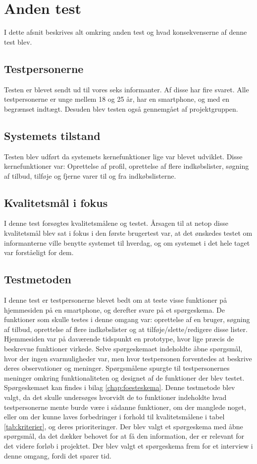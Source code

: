 \section{Anden test}
\label{sec:andentest}
I dette afsnit beskrives alt omkring anden test og hvad konsekvenserne af denne test blev. 

\subsection{Testpersonerne}
Testen er blevet sendt ud til vores seks informanter. Af disse har fire svaret. Alle testpersonerne er unge mellem 18 og 25 år, har en smartphone, og med en begrænset indtægt. Desuden blev testen også gennemgået af projektgruppen.

\subsection{Systemets tilstand}
Testen blev udført da systemets kernefunktioner lige var blevet udviklet. Disse kernefunktioner var: Oprettelse af profil, oprettelse af flere indkøbslister, søgning af tilbud, tilføje og fjerne varer til og fra indkøbslisterne. 

\subsection{Kvalitetsmål i fokus}
I denne test forsøgtes kvalitetsmålene  og  testet. Årsagen til at netop disse kvalitetsmål blev sat i fokus i den første brugertest var, at det ønskedes testet om informanterne ville benytte systemet til hverdag, og om systemet i det hele taget var forståeligt for dem. 

\subsection{Testmetoden}
I denne test er testpersonerne blevet bedt om at teste visse funktioner på hjemmesiden på en smartphone, og derefter svare på et spørgeskema. De funktioner som skulle testes i denne omgang var: oprettelse af en bruger, søgning af tilbud, oprettelse af flere indkøbslister og at tilføje/slette/redigere disse lister. Hjemmesiden var på daværende tidspunkt en prototype, hvor lige præcis de beskrevne funktioner virkede.
Selve spørgeskemaet indeholdte åbne spørgsmål, hvor der ingen svarmuligheder var, men hvor testpersonen forventedes at beskrive deres observationer og meninger. Spørgsmålene spurgte til testpersonernes meninger omkring funktionaliteten og designet af de funktioner der blev testet. Spørgeskemaet kan findes i bilag \ref{chap:foesteskema}.
Denne testmetode blev valgt, da det skulle undersøges hvorvidt de to funktioner indeholdte hvad testpersonerne mente burde være i sådanne funktioner, om der manglede noget, eller om der kunne laves forbedringer i forhold til kvalitetsmålene i tabel \ref{tab:kriterier}, og deres prioriteringer. Der blev valgt et spørgeskema med åbne spørgsmål, da det dækker behovet for at få den information, der er relevant for det videre forløb i projektet. Der blev valgt et spørgeskema frem for et interview i denne omgang, fordi det sparer tid. 

